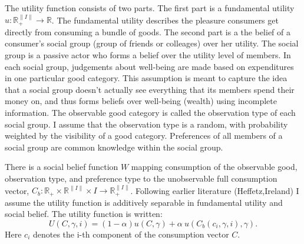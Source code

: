 \documentclass{article}
\begin{document}
The utility function consists of two parts.  The first part is a fundamental utility $u:\mathbb{R}_+^{\|I\|}\rightarrow\mathbb{R}$.
The fundamental utility describes the pleasure consumers get directly from consuming a bundle of goods.
The second part is a the belief of a consumer's social group (group of friends or colleages) over her utility.
The social group is a passive actor who forms a belief over the utility level of members.  
In each social group, judgements about well-being are made based on expenditures in one particular good category.
This assumption is meant to capture the idea that a social group doesn't actually see everything that its members spend their money on, and thus forms beliefs over well-being (wealth) using incomplete information.
The observable good category is called the observation type of each social group.
I assume that the observation type is a random, with probability weighted by the visibility of a good category.
Preferences of all members of a social group are common knowledge within the social group.

There is a social belief function $W$ mapping consumption of the observable good, observation type, and preference type to the unobservable full consumption vector, $C_b: \mathbb{R}_+\times\mathbb{R}^{\|I\|}\times I\rightarrow \mathbb{R}_+^{\|I\|}$.
Following earlier literature (Heffetz,Ireland) I assume the utility function is additively separable in fundamental utility and social belief.
The utility function is written:
\[U(C,\gamma,i) = (1-\alpha) u(C,\gamma) + \alpha\  u(C_b(c_i,\gamma,i),\gamma).\]
Here $c_i$ denotes the i-th component of the consumption vector $C$.
\end{document}
